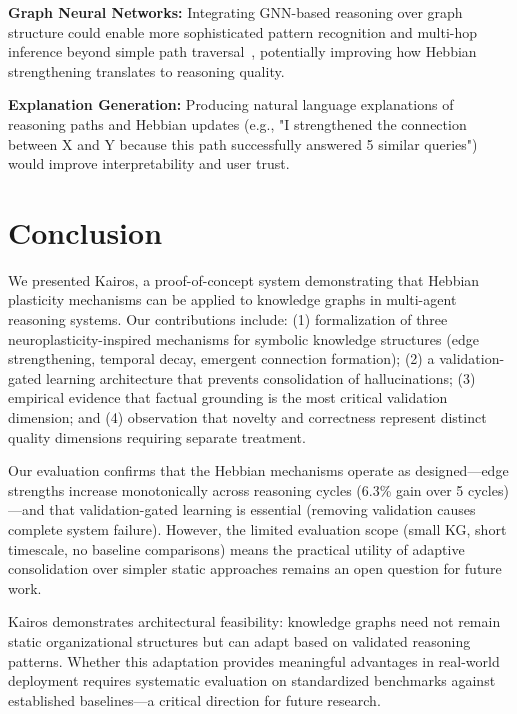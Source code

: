 \documentclass{article}
\begin{document}
\textbf{Graph Neural Networks:} Integrating GNN-based reasoning over graph structure could enable more sophisticated pattern recognition and multi-hop inference beyond simple path traversal~\citep{luo2024rog}, potentially improving how Hebbian strengthening translates to reasoning quality.

\textbf{Explanation Generation:} Producing natural language explanations of reasoning paths and Hebbian updates (e.g., "I strengthened the connection between X and Y because this path successfully answered 5 similar queries") would improve interpretability and user trust.

\section{Conclusion}

We presented Kairos, a proof-of-concept system demonstrating that Hebbian plasticity mechanisms can be applied to knowledge graphs in multi-agent reasoning systems. Our contributions include: (1) formalization of three neuroplasticity-inspired mechanisms for symbolic knowledge structures (edge strengthening, temporal decay, emergent connection formation); (2) a validation-gated learning architecture that prevents consolidation of hallucinations; (3) empirical evidence that factual grounding is the most critical validation dimension; and (4) observation that novelty and correctness represent distinct quality dimensions requiring separate treatment.

Our evaluation confirms that the Hebbian mechanisms operate as designed—edge strengths increase monotonically across reasoning cycles (6.3\% gain over 5 cycles)—and that validation-gated learning is essential (removing validation causes complete system failure). However, the limited evaluation scope (small KG, short timescale, no baseline comparisons) means the practical utility of adaptive consolidation over simpler static approaches remains an open question for future work.

Kairos demonstrates architectural feasibility: knowledge graphs need not remain static organizational structures but can adapt based on validated reasoning patterns. Whether this adaptation provides meaningful advantages in real-world deployment requires systematic evaluation on standardized benchmarks against established baselines—a critical direction for future research.



\end{document}
